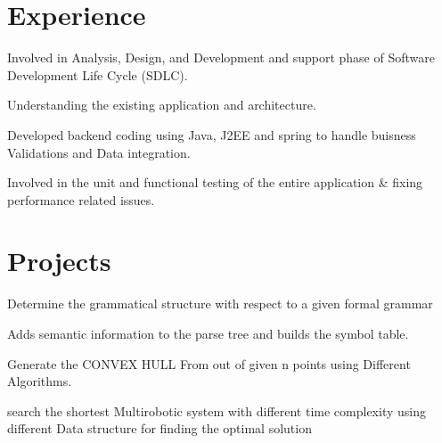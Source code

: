 \documentclass[]{deedy-resume-openfont}
\begin{document}
\hfill
\begin{minipage}[t]{0.66\textwidth} 
\section{Experience}
\sectionsep
{}
\vspace{\topsep}
\vspace{\topsep}
\begin{tightemize}
\item Involved in Analysis, Design, and Development and support phase of Software Development Life Cycle (SDLC).
\item Understanding the existing application and architecture.
\item Developed backend coding using Java, J2EE and spring to handle buisness Validations and Data integration.
\item Involved in the unit and functional testing of the entire application \& fixing performance related issues.
\end{tightemize} 

\sectionsep

\section{Projects}

\vspace{\topsep}
\vspace{\topsep}
\begin{tightemize}
\item Determine the grammatical structure with respect to a given formal grammar
\item Adds semantic information to the parse tree and builds the symbol table.
\end{tightemize}
\sectionsep

\vspace{\topsep} %
\begin{tightemize}
\item Generate the CONVEX HULL From out of given n points using Different
Algorithms. 
\item search the shortest Multirobotic system with different time complexity using
different Data structure for finding the optimal solution 


\end{tightemize}
\end{minipage}
\end{document}
